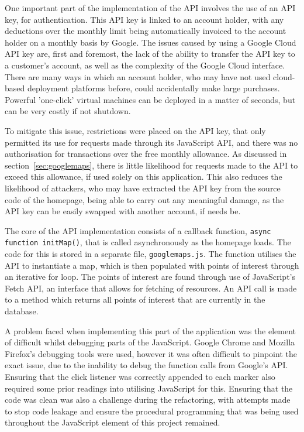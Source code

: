 One important part of the implementation of the API involves the use of an API key, for authentication. This API key is linked to an account holder, with any deductions over the monthly limit being automatically invoiced to the account holder on a monthly basis by Google. The issues caused by using a Google Cloud API key are, first and foremost, the lack of the ability to transfer the API key to a customer's account, as well as the complexity of the Google Cloud interface. There are many ways in which an account holder, who may have not used cloud-based deployment platforms before, could accidentally make large purchases. Powerful 'one-click' virtual machines can be deployed in a matter of seconds, but can be very costly if not shutdown.

To mitigate this issue, restrictions were placed on the API key, that only permitted its use for requests made through its JavaScript API, and there was no authorisation for transactions over the free monthly allowance. As discussed in section~\ref{sec:googlemaps}, there is little likelihood for requests made to the API to exceed this allowance, if used solely on this application. This also reduces the likelihood of attackers, who may have extracted the API key from the source code of the homepage, being able to carry out any meaningful damage, as the API key can be easily swapped with another account, if needs be.

The core of the API implementation consists of a callback function, \texttt{async function initMap()}, that is called asynchronously as the homepage loads. The code for this is stored in a separate file, \texttt{googlemaps.js}. The function utilises the API to instantiate a map, which is then populated with points of interest through an iterative for loop. The points of interest are found through use of JavaScript's Fetch API, an interface that allows for fetching of resources. An API call is made to a method which returns all points of interest that are currently in the database.

A problem faced when implementing this part of the application was the element of difficult whilst debugging parts of the JavaScript. Google Chrome and Mozilla Firefox's debugging tools were used, however it was often difficult to pinpoint the exact issue, due to the inability to debug the function calls from Google's API. Ensuring that the click listener was correctly appended to each marker also required some prior readings into utilising JavaScript for this. Ensuring that the code was clean was also a challenge during the refactoring, with attempts made to stop code leakage and ensure the procedural programming that was being used throughout the JavaScript element of this project remained.

